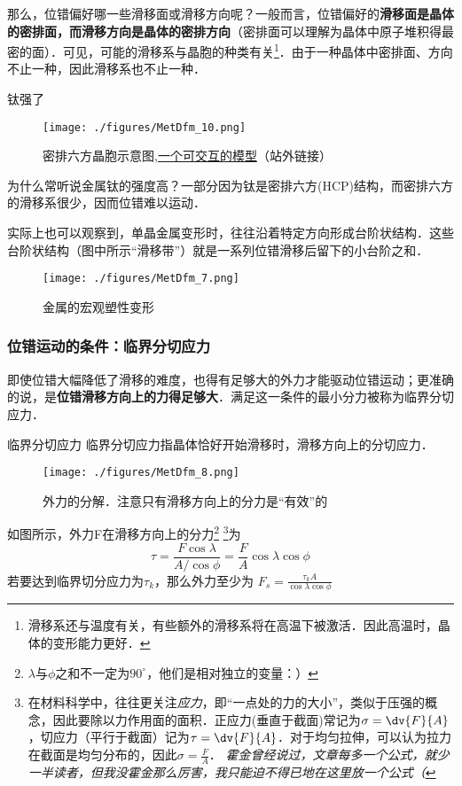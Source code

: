 那么，位错偏好哪一些滑移面或滑移方向呢？一般而言，位错偏好的\textbf{滑移面是晶体的密排面，而滑移方向是晶体的密排方向}（密排面可以理解为晶体中原子堆积得最密的面）．可见，可能的滑移系与晶胞的种类有关\footnote{滑移系还与温度有关，有些额外的滑移系将在高温下被激活．因此高温时，晶体的变形能力更好．}．由于一种晶体中密排面、方向不止一种，因此滑移系也不止一种．

\begin{example}{钛强了}
\begin{figure}[ht]
\centering
\texttt{[image: ./figures/MetDfm\_10.png]}
\caption{密排六方晶胞示意图,\href{https://www.geogebra.org/m/xrzejabt}{一个可交互的模型}（站外链接）} \label{MetDfm_fig10}
\end{figure}
为什么常听说金属钛的强度高？一部分因为钛是密排六方(HCP)结构，而密排六方的滑移系很少，因而位错难以运动．
\end{example}

实际上也可以观察到，单晶金属变形时，往往沿着特定方向形成台阶状结构．这些台阶状结构（图中所示“滑移带”）就是一系列位错滑移后留下的小台阶之和．
\begin{figure}[ht]
\centering
\texttt{[image: ./figures/MetDfm\_7.png]}
\caption{金属的宏观塑性变形} \label{MetDfm_fig7}
\end{figure}

\subsubsection{位错运动的条件：临界分切应力}
即使位错大幅降低了滑移的难度，也得有足够大的外力才能驱动位错运动；更准确的说，是\textbf{位错滑移方向上的力得足够大}．满足这一条件的最小分力被称为临界分切应力．

\begin{definition}{临界分切应力}
临界分切应力指晶体恰好开始滑移时，滑移方向上的分切应力．
\end{definition}

\begin{figure}[ht]
\centering
\texttt{[image: ./figures/MetDfm\_8.png]}
\caption{外力的分解．注意只有滑移方向上的分力是“有效”的} \label{MetDfm_fig8}
\end{figure}

如图所示，外力F在滑移方向上的分力\footnote{$\lambda$与$\phi$之和不一定为$90^\circ$，他们是相对独立的变量：）} \footnote{在材料科学中，往往更关注\textsl{应力}，即“一点处的力的大小”，类似于压强的概念，因此要除以力作用面的面积．正应力(垂直于截面)常记为$\sigma=\dv{F}{A}$，切应力（平行于截面）记为$\tau=\dv{F}{A}$．对于均匀拉伸，可以认为拉力在截面是均匀分布的，因此$\sigma=\frac{F}{A}$． \textsl{霍金曾经说过，文章每多一个公式，就少一半读者，但我没霍金那么厉害，我只能迫不得已地在这里放一个公式（}}为
\begin{equation}
\tau=\frac{F \cos \lambda}{A/{\cos \phi}}=\frac{F}{A}{\cos \lambda}{\cos \phi}
\end{equation}
若要达到临界切分应力为$\tau_k$，那么外力至少为 $F_s=\frac{\tau_k A}{\cos \lambda \cos \phi} $ 

